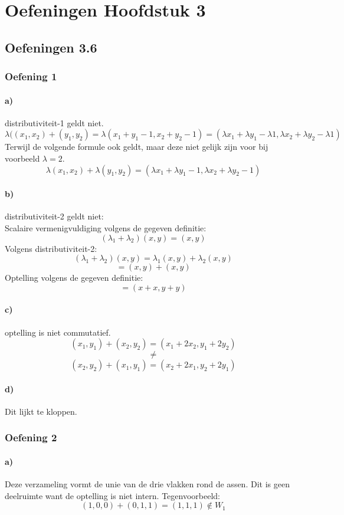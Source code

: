 \documentclass[lineaire_algebra_oplossingen.tex]{subfiles}
\begin{document}
\chapter{Oefeningen Hoofdstuk 3}
\section{Oefeningen 3.6}
\subsection{Oefening 1}
\subsubsection*{a)}
distributiviteit-1 geldt niet.
\[
\lambda((x_1,x_2) + (y_1,y_2)  = \lambda(x_1+y_1-1,x_2+y_2-1) = (\lambda x_1+\lambda y_1-\lambda 1,\lambda x_2+\lambda y_2-\lambda 1)
\]
Terwijl de volgende formule ook geldt, maar deze niet gelijk zijn voor bij voorbeeld $\lambda = 2$.
\[
\lambda(x_1,x_2) + \lambda(y_1,y_2) = (\lambda x_1+\lambda y_1- 1,\lambda x_2+\lambda y_2-1)
\]
\subsubsection*{b)}
distributiviteit-2 geldt niet:\\
Scalaire vermenigvuldiging volgens de gegeven definitie:
$$
(\lambda_1 + \lambda_2)(x,y) = (x,y)
$$
Volgens distributiviteit-2:
$$
(\lambda_1 + \lambda_2)(x,y) = \lambda_1(x,y) + \lambda_2(x,y)
$$
$$
= (x,y) + (x,y)
$$
Optelling volgens de gegeven definitie:
$$
= (x+x, y+y)
$$

\subsubsection*{c)}
optelling is niet commutatief.
\[
(x_1,y_1) + (x_2,y_2) = (x_1+2x_2,y_1+2y_2)
\]
\[ \neq \]
\[
(x_2,y_2) + (x_1,y_1) = (x_2+2x_1,y_2+2y_1)
\]

\subsubsection*{d)}
Dit lijkt te kloppen.

\subsection{Oefening 2}
\subsubsection*{a)}
Deze verzameling vormt de unie van de drie vlakken rond de assen. Dit is geen deelruimte want de optelling is niet intern. Tegenvoorbeeld:
\[
(1,0,0) + (0,1,1) = (1,1,1) \not \in W_1
\]
\end{document}
